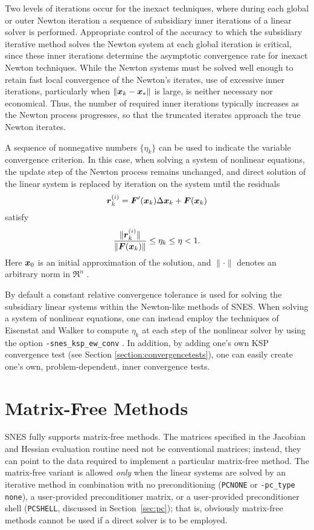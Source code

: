 Two levels of iterations occur for the inexact techniques, where 
during each global or outer Newton iteration a sequence of 
subsidiary inner iterations of a linear solver is performed.
Appropriate control of the accuracy to which the subsidiary 
iterative method solves the Newton system
at each global iteration is critical, since these 
inner iterations determine the asymptotic convergence rate for 
inexact Newton techniques.
While the Newton systems must be solved well enough to retain
fast local convergence of the Newton's iterates, use of excessive
inner iterations, particularly when $ \| \mbox{\boldmath \(x\)}_k - \mbox{\boldmath \(x\)}_* \| $ is large,
is neither necessary nor economical.
Thus, the number of required inner iterations typically increases
as the Newton process progresses, so that the truncated iterates
approach the true Newton iterates.

A sequence of nonnegative numbers $ \{\eta_k\} $ can be used to 
indicate the variable convergence criterion.
In this case, when solving a system of nonlinear equations, the 
update step of the Newton process remains unchanged, and direct 
solution of the linear system is replaced by iteration on the 
system until the residuals
\[  \mbox{\boldmath \(r\)}_k^{(i)} =  \mbox{\boldmath \(F\)}'(\mbox{\boldmath \(x\)}_k) \Delta \mbox{\boldmath \(x\)}_k + \mbox{\boldmath \(F\)}(\mbox{\boldmath \(x\)}_k) \]
satisfy
\[  \frac{ \| \mbox{\boldmath \(r\)}_k^{(i)} \| }{ \| \mbox{\boldmath \(F\)}(\mbox{\boldmath \(x\)}_k) \| } \leq \eta_k \leq \eta < 1. \]
Here $ \mbox{\boldmath \(x\)}_0 $ is an initial approximation of the solution, and
$ \| \cdot \| $ denotes an arbitrary norm in $ \Re^n $ .  

By default a constant relative convergence tolerance is used for
solving the subsidiary linear systems within the Newton-like methods
of SNES.  When solving a system of nonlinear equations, one can
instead employ the techniques of Eisenstat and Walker \cite{ew94}
to compute $ \eta_k $ at each step of the nonlinear solver by using the
option {\tt -snes\_ksp\_ew\_conv} . In addition,
by adding one's own KSP convergence test (see Section 
\ref{section:convergencetests}), one can easily create one's own,
problem-dependent, inner convergence tests. 

\section{Matrix-Free Methods}
\label{sec:nlmatrixfree}

SNES fully supports matrix-free methods. The matrices specified in the
Jacobian and Hessian evaluation routine need not be conventional
matrices; instead, they can point to the data required to implement a
particular matrix-free method.  The matrix-free variant is allowed
{\em only} when the linear systems are solved by an iterative method
in combination with no preconditioning ({\tt PCNONE} or {\tt -pc\_type none}),
a user-provided preconditioner matrix, or a user-provided preconditioner
shell ({\tt PCSHELL}, discussed in Section~\ref{sec:pc}); that is,
obviously matrix-free methods cannot be used if a direct solver is to 
be employed.  

